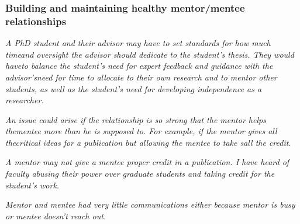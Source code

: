\documentclass{beamer}
\begin{document}


\begin{frame} %

\frametitle{Building and maintaining healthy mentor/mentee relationships}


{  \it A PhD student and their advisor may have to set standards for how much timeand oversight the advisor should dedicate to the student’s thesis. They would haveto balance the student’s need for expert feedback and guidance with the advisor’sneed for time to allocate to their own research and to mentor other students, as well as the student’s need for developing independence as a researcher.}

\medskip

  {\it An  issue  could  arise  if  the  relationship  is  so  strong  that  the  mentor  helps  thementee  more  than  he  is  supposed  to.   For  example,  if  the  mentor  gives  all  thecritical ideas for a publication but allowing the mentee to take sall the credit.}

  \medskip

\end{frame}
\begin{frame}
  
{\it   A  mentor  may  not  give  a  mentee  proper  credit  in  a  publication.   I  have  heard of faculty abusing their power over graduate students and taking credit for the student’s work.}

\medskip

{\it Mentor and mentee had very little communications either because mentor is busy or mentee doesn’t reach out.}





\medskip


\end{frame}
\end{document}
